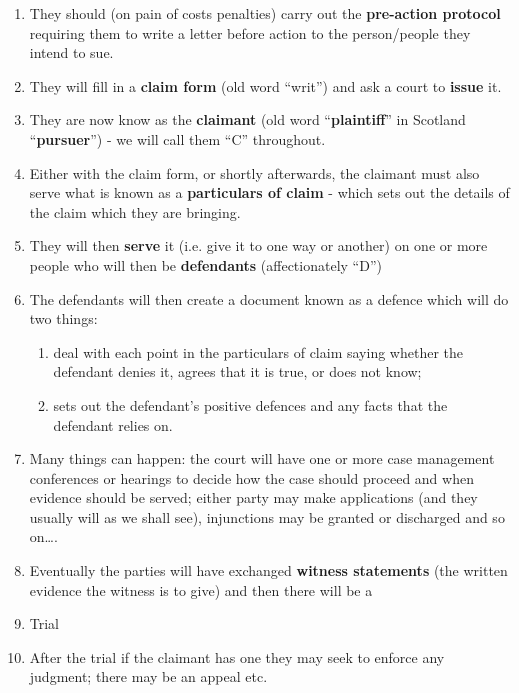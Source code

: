 \documentclass[]{article}
\begin{document}
\begin{enumerate}
\item
  {They should (on pain of costs penalties) carry out the
  }\textbf{pre-action protocol}{ requiring them to write a letter before
  action to the person/people they intend to sue.}
\item
  {They will fill in a }\textbf{claim form}{ (old word ``writ'') and ask
  a court to }\textbf{issue}{ it. }
\item
  {They are now know as the }\textbf{claimant} {(old word} \textbf{}
  {``}\textbf{plaintiff}{''} \textbf{} {in Scotland
  ``}\textbf{pursuer}{'') - we will call them ``C'' throughout.}
\item
  {Either with the claim form, or shortly afterwards, the claimant must
  also serve what is known as a }\textbf{particulars of claim}{ - which
  sets out the details of the claim which they are bringing.}
\item
  {They will then }\textbf{serve}{ it (i.e. give it to one way or
  another) on one or more people who will then be }\textbf{defendants}{
  (affectionately ``D'')}
\item
  The defendants will then create a document known as a defence which
  will do two things:

  \begin{enumerate}
  \item
    deal with each point in the particulars of claim saying whether the
    defendant denies it, agrees that it is true, or does not know;
  \item
    sets out the defendant's positive defences and any facts that the
    defendant relies on.
  \end{enumerate}
\item
  Many things can happen: the court will have one or more case
  management conferences or hearings to decide how the case should
  proceed and when evidence should be served; either party may make
  applications (and they usually will as we shall see), injunctions may
  be granted or discharged and so on\ldots{}.
\item
  {Eventually the parties will have exchanged }\textbf{witness
  statements}{ (the written evidence the witness is to give) and then
  there will be a}
\item
  Trial
\item
  After the trial if the claimant has one they may seek to enforce any
  judgment; there may be an appeal etc.
\end{enumerate}
\end{document}
